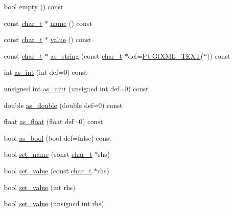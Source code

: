 \begin{DoxyCompactItemize}
\item 
bool \hyperlink{classpugi_1_1xml__attribute_a961a571d7397e1803c3f63cf96052c53}{empty} () const 
\item 
const \hyperlink{namespacepugi_aef5a7a62cba0507542220ea15afe39df}{char\-\_\-t} $\ast$ \hyperlink{classpugi_1_1xml__attribute_a98377c82f36c74f211d16db275577334}{name} () const 
\item 
const \hyperlink{namespacepugi_aef5a7a62cba0507542220ea15afe39df}{char\-\_\-t} $\ast$ \hyperlink{classpugi_1_1xml__attribute_ad535b73777f3eaa1c0c0a3c168683bd3}{value} () const 
\item 
const \hyperlink{namespacepugi_aef5a7a62cba0507542220ea15afe39df}{char\-\_\-t} $\ast$ \hyperlink{classpugi_1_1xml__attribute_a583f470d768f5f8a4df0ebb2e016a88d}{as\-\_\-string} (const \hyperlink{namespacepugi_aef5a7a62cba0507542220ea15afe39df}{char\-\_\-t} $\ast$def=\hyperlink{pugixml_8hpp_ad5475bca2e336810ae5906349e644d0b}{P\-U\-G\-I\-X\-M\-L\-\_\-\-T\-E\-X\-T}(\char`\"{}\char`\"{})) const 
\item 
int \hyperlink{classpugi_1_1xml__attribute_afe009e964b9cec96c77495ef1ae6d91f}{as\-\_\-int} (int def=0) const 
\item 
unsigned int \hyperlink{classpugi_1_1xml__attribute_af89be4951cf7567053bcbb66ce013156}{as\-\_\-uint} (unsigned int def=0) const 
\item 
double \hyperlink{classpugi_1_1xml__attribute_acd8d510ac7825b0f52f4795d2cc5e00b}{as\-\_\-double} (double def=0) const 
\item 
float \hyperlink{classpugi_1_1xml__attribute_a23f960683dba03f32ed4da19a10c769d}{as\-\_\-float} (float def=0) const 
\item 
bool \hyperlink{classpugi_1_1xml__attribute_a715646ddcfcd9f327934f9083f949796}{as\-\_\-bool} (bool def=false) const 
\item 
bool \hyperlink{classpugi_1_1xml__attribute_ae8ffb5ef48338f27015337a6f57b6595}{set\-\_\-name} (const \hyperlink{namespacepugi_aef5a7a62cba0507542220ea15afe39df}{char\-\_\-t} $\ast$rhs)
\item 
bool \hyperlink{classpugi_1_1xml__attribute_af2ca1f0d13ee8f661bc17524bedc13d7}{set\-\_\-value} (const \hyperlink{namespacepugi_aef5a7a62cba0507542220ea15afe39df}{char\-\_\-t} $\ast$rhs)
\item 
bool \hyperlink{classpugi_1_1xml__attribute_aa9fcffccebda6ae6169e4d17265bd39a}{set\-\_\-value} (int rhs)
\item 
bool \hyperlink{classpugi_1_1xml__attribute_abffdc566e5e2805c493f18f8424f5024}{set\-\_\-value} (unsigned int rhs)

\end{DoxyCompactItemize}
